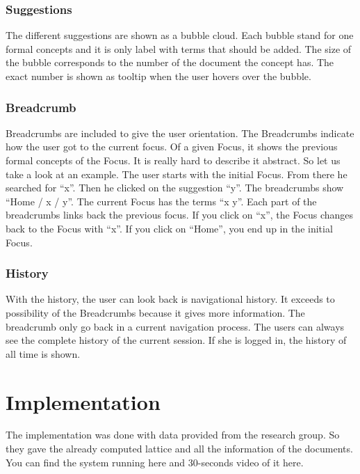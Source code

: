 \documentclass[11pt]{report}
\begin{document}
\subsubsection{Suggestions}

The different suggestions are shown as a bubble cloud. Each bubble stand for one formal concepts and it is only label with terms that should be added. The size of the bubble corresponds to the number of the document the concept has. The exact number is shown as tooltip when the user hovers over the bubble.

\subsubsection{Breadcrumb}

Breadcrumbs are included to give the user orientation. The Breadcrumbs indicate how the user got to the current focus. Of a given Focus, it shows the previous formal concepts of the Focus. It is really hard to describe it abstract. So let us take a look at an example. The user starts with the initial Focus. From there he searched for ``x''. Then he clicked on the suggestion ``y''. The breadcrumbs show ``Home / x / y''. The current Focus has the terms ``x y''. Each part of the breadcrumbs links back the previous focus. If you click on ``x'', the Focus changes back to the Focus with ``x''. If you click on ``Home'', you end up in the initial Focus. 

\subsubsection{History}

With the history, the user can look back is navigational history. It exceeds to possibility of the Breadcrumbs because it gives more information. The breadcrumb only go back in a current navigation process. The users can always see the complete history of the current session. If she is logged in, the history of all time is shown.

\section{Implementation}

The implementation was done with data provided from the research group. So they gave the already computed lattice and all the information of the documents. You can find the system running here and 30-seconds video of it here. \\
\end{document}
